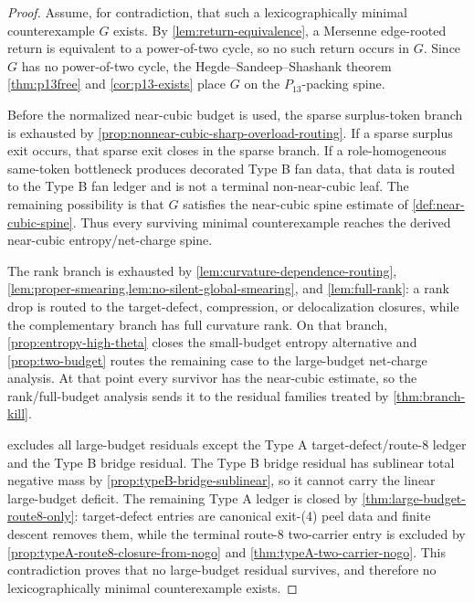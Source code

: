 \documentclass[11pt]{article}
\begin{document}
\begin{proof}
Assume, for contradiction, that such a lexicographically minimal counterexample
\(G\) exists.  By \cref{lem:return-equivalence}, a Mersenne edge-rooted return
is equivalent to a power-of-two cycle, so no such return occurs in \(G\).
Since \(G\) has no power-of-two cycle, the Hegde--Sandeep--Shashank theorem
\cref{thm:p13free} and \cref{cor:p13-exists} place \(G\) on the
\(P_{13}\)-packing spine.

Before the normalized near-cubic budget is used, the sparse surplus-token
branch is exhausted by \cref{prop:nonnear-cubic-sharp-overload-routing}.  If a sparse
surplus exit occurs, that sparse exit closes in the sparse branch.  If a
role-homogeneous same-token bottleneck produces decorated Type B fan data, that
data is routed to the Type B fan ledger and is not a terminal non-near-cubic
leaf.  The remaining possibility is that \(G\) satisfies the near-cubic spine
estimate of \cref{def:near-cubic-spine}.  Thus every surviving minimal
counterexample reaches the derived near-cubic entropy/net-charge spine.

The rank branch is exhausted by \cref{lem:curvature-dependence-routing},
\cref{lem:proper-smearing,lem:no-silent-global-smearing}, and
\cref{lem:full-rank}: a rank drop is routed to the target-defect,
compression, or delocalization closures, while the complementary branch has
full curvature rank.  On that branch, \cref{prop:entropy-high-theta} closes the
small-budget entropy alternative and \cref{prop:two-budget} routes the
remaining case to the large-budget net-charge analysis.  At that point every
survivor has the near-cubic estimate, so the rank/full-budget analysis sends it
to the residual families treated by \cref{thm:branch-kill}.

 excludes all large-budget residuals except the Type A
target-defect/route-8 ledger and the Type B bridge residual.  The Type B bridge
residual has sublinear total negative mass by
\cref{prop:typeB-bridge-sublinear}, so it cannot carry the linear large-budget
deficit.  The remaining Type A ledger is closed by
\cref{thm:large-budget-route8-only}: target-defect entries are canonical
exit-\textup{(4)} peel data and finite descent removes them, while the terminal
route-8 two-carrier entry is excluded by
\cref{prop:typeA-route8-closure-from-nogo} and
\cref{thm:typeA-two-carrier-nogo}.  This contradiction proves that no
large-budget residual survives, and therefore no lexicographically minimal
counterexample exists.
\end{proof}
\end{document}
